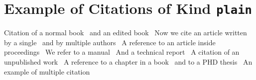 \documentclass {article}
\begin{document}
\section*{Example of Citations of Kind \texttt{plain}}

Citation of a normal book~\cite{Eijkhout:1991} and an edited book~\cite{Roth:postscript}
Now we cite an article written by a single~\cite{Felici:1991} 
and by multiple authors~\cite{Mittelbach/Schoepf:1990}
A reference to an article inside proceedings~\cite{Yannis:1991}
We refer to a manual~\cite{Dynatext}
And a technical report~\cite{Knuth:WEB}
A citation of an unpublished work~\cite{EVH:office}
A reference to a chapter in a book~\cite{Wood:color} and to a PHD thesis~\cite{Liang:1983}
An example of multiple citation~\cite{Eijkhout:1991,Roth:postscript}




\end{document}

